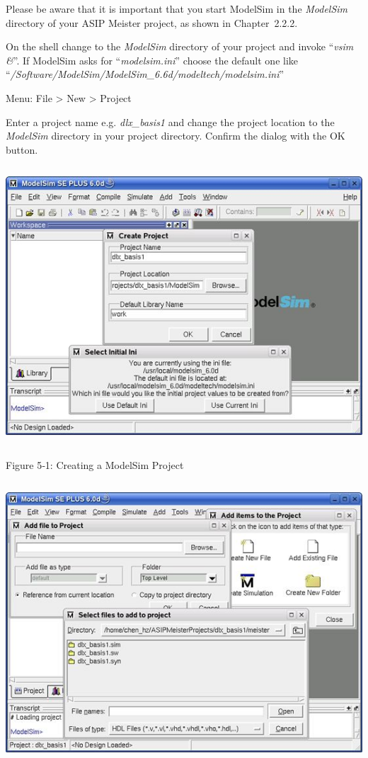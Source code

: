 \documentclass[
]{article}
\begin{document}
Please be aware that it is important that you start ModelSim in the
\emph{ModelSim} directory of your ASIP Meister project, as shown in
Chapter~2.2.2.

On the shell change to the \emph{ModelSim} directory of your project and
invoke ``\emph{vsim \&}''. If ModelSim asks for ``\emph{modelsim.ini}''
choose the default one like
``\emph{/Software/ModelSim/ModelSim\_6.6d/modeltech/modelsim.ini}''

Menu: File \textgreater{} New \textgreater{} Project

Enter a project name e.g. \emph{dlx\_basis1} and change the project
location to the \emph{ModelSim} directory in your project directory.
Confirm the dialog with the OK button.

\includegraphics[width=5.65694in,height=4.08958in]{5-1.png}

Figure 5‑1: Creating a ModelSim Project

\includegraphics[width=5.68681in,height=4.13403in]{5-2.png}
\end{document}
